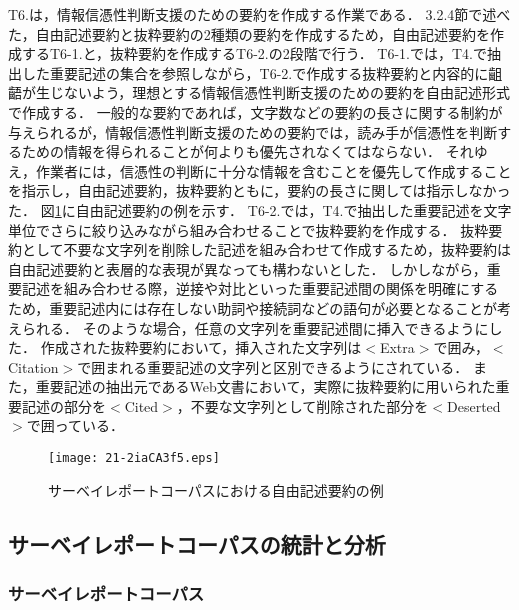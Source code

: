 \documentclass[japanese]{jnlp_1.4}
\begin{document}
T6.は，情報信憑性判断支援のための要約を作成する作業である．
3.2.4節で述べた，自由記述要約と抜粋要約の2種類の要約を作成するため，自由記述要約を作成するT6-1.と，抜粋要約を作成するT6-2.の2段階で行う．
T6-1.では，T4.で抽出した重要記述の集合を参照しながら，T6-2.で作成する抜粋要約と内容的に齟齬が生じないよう，理想とする情報信憑性判断支援のための要約を自由記述形式で作成する．
一般的な要約であれば，文字数などの要約の長さに関する制約が与えられるが，情報信憑性判断支援のための要約では，読み手が信憑性を判断するための情報を得られることが何よりも優先されなくてはならない．
それゆえ，作業者には，信憑性の判断に十分な情報を含むことを優先して作成することを指示し，自由記述要約，抜粋要約ともに，要約の長さに関しては指示しなかった．
{図}\ref{fg:SR_freestyle}に自由記述要約の例を示す．
T6-2.では，T4.で抽出した重要記述を文字単位でさらに絞り込みながら組み合わせることで抜粋要約を作成する．
抜粋要約として不要な文字列を削除した記述を組み合わせて作成するため，抜粋要約は自由記述要約と表層的な表現が異なっても構わないとした．
しかしながら，重要記述を組み合わせる際，逆接や対比といった重要記述間の関係を明確にするため，重要記述内には存在しない助詞や接続詞などの語句が必要となることが考えられる．
そのような場合，任意の文字列を重要記述間に挿入できるようにした．
作成された抜粋要約において，挿入された文字列は{\sf $<$Extra$>$}で囲み，{\sf $<$Citation$>$}で囲まれる重要記述の文字列と区別できるようにされている．
また，重要記述の抽出元であるWeb文書において，実際に抜粋要約に用いられた重要記述の部分を{\sf $<$Cited$>$}，不要な文字列として削除された部分を{\sf $<$Deserted$>$}で囲っている．

\begin{figure}[t]
\begin{center}
\texttt{[image: 21-2iaCA3f5.eps]}
\end{center}
\caption{サーベイレポートコーパスにおける自由記述要約の例}
\label{fg:SR_freestyle}
\end{figure}


\subsection{サーベイレポートコーパスの統計と分析}

\subsubsection{サーベイレポートコーパス}
\end{document}
